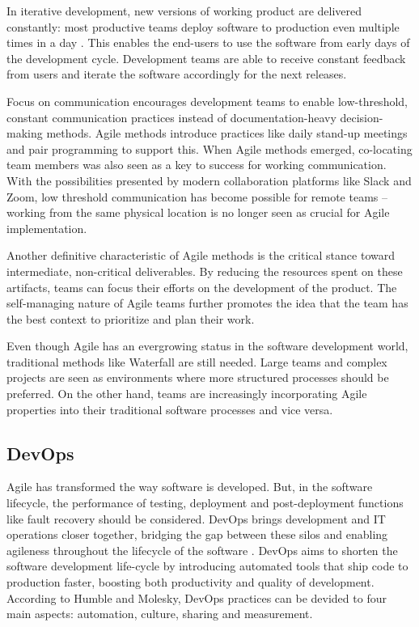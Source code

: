 In iterative development, new versions of working product are delivered constantly: most productive teams deploy software to production even multiple times in a day \cite{forsgren_accelerate_2018}. This enables the end-users to use the software from early days of the development cycle. Development teams are able to receive constant feedback from users and iterate the software accordingly for the next releases. \cite{balaji_waterfall_2012}

Focus on communication encourages development teams to enable low-threshold, constant communication practices instead of documentation-heavy decision-making methods. Agile methods introduce practices like daily stand-up meetings and pair programming to support this. When Agile methods emerged, co-locating team members was also seen as a key to success for working communication. With the possibilities presented by modern collaboration platforms like Slack and Zoom, low threshold communication has become possible for remote teams – working from the same physical location is no longer seen as crucial for Agile implementation.

Another definitive characteristic of Agile methods is the critical stance toward intermediate, non-critical deliverables. By reducing the resources spent on these artifacts, teams can focus their efforts on the development of the product. \cite{cohen_introduction_2004} The self-managing nature of Agile teams further promotes the idea that the team has the best context to prioritize and plan their work. \cite{alshamrani_comparison_2015} 

Even though Agile has an evergrowing status in the software development world, traditional methods like Waterfall are still needed. Large teams and complex projects are seen as environments where more structured processes should be preferred. On the other hand, teams are increasingly incorporating Agile properties into their traditional software processes and vice versa. \cite{cohen_introduction_2004} 

\subsection{DevOps}

Agile has transformed the way software is developed. But, in the software lifecycle, the performance of testing, deployment and post-deployment functions like fault recovery should be considered. DevOps brings development and IT operations closer together, bridging the gap between these silos and enabling agileness throughout the lifecycle of the software \cite{hemon-hildgen_agile_2020}. DevOps aims to shorten the software development life-cycle by introducing automated tools that ship code to production faster, boosting both productivity and quality of development\cite{cois_modern_2014}. According to Humble and Molesky, DevOps practices can be devided to four main aspects: automation, culture, sharing and measurement\cite{humble_why_2011}. 


